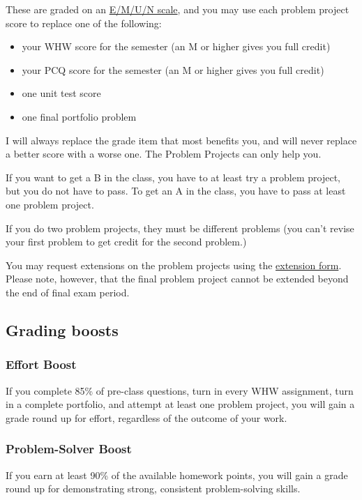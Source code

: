 \documentclass[
  letterpaper,
  DIV=11,
  numbers=noendperiod]{scrartcl}
\providecommand{\tightlist}{%
  \setlength{\itemsep}{0pt}\setlength{\parskip}{0pt}}\usepackage{longtable,booktabs,array}
\begin{document}
These are graded on an \hyperref[emun]{E/M/U/N scale}, and you may use
each problem project score to replace one of the following:

\begin{itemize}
\tightlist
\item
  your WHW score for the semester (an M or higher gives you full credit)
\item
  your PCQ score for the semester (an M or higher gives you full credit)
\item
  one unit test score
\item
  one final portfolio problem
\end{itemize}

I will always replace the grade item that most benefits you, and will
never replace a better score with a worse one. The Problem Projects can
only help you.

If you want to get a B in the class, you have to at least try a problem
project, but you do not have to pass. To get an A in the class, you have
to pass at least one problem project.

If you do two problem projects, they must be different problems (you
can't revise your first problem to get credit for the second problem.)

You may request extensions on the problem projects using the
\href{https://forms.gle/eFx7y7FoSdoukKGC6}{extension form}. Please note,
however, that the final problem project cannot be extended beyond the
end of final exam period.

\subsection{Grading boosts}\label{grading-boosts}

\subsubsection{Effort Boost}

If you complete 85\% of pre-class questions, turn in every WHW
assignment, turn in a complete portfolio, and attempt at least one
problem project, you will gain a grade round up for effort, regardless
of the outcome of your work.

\subsubsection{Problem-Solver Boost}

If you earn at least 90\% of the available homework points, you will
gain a grade round up for demonstrating strong, consistent
problem-solving skills.
\end{document}
